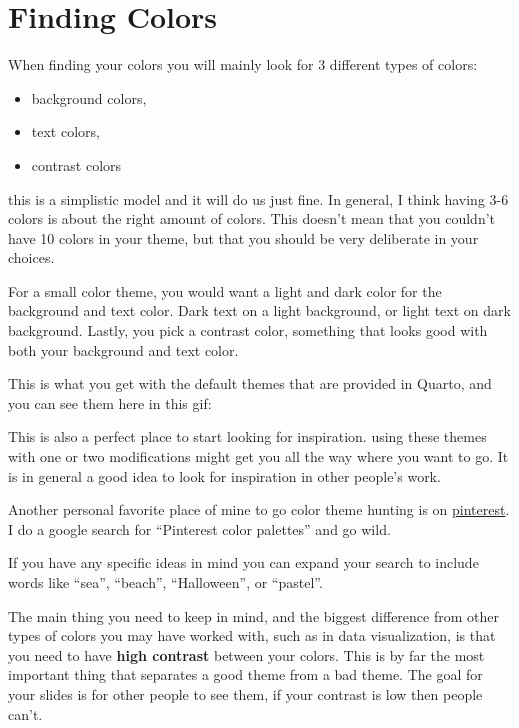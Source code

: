 \documentclass[
  letterpaper,
  DIV=11,
  numbers=noendperiod]{scrreprt}
\providecommand{\tightlist}{%
  \setlength{\itemsep}{0pt}\setlength{\parskip}{0pt}}\usepackage{longtable,booktabs,array}
\begin{document}
\section{Finding Colors}\label{finding-colors}

When finding your colors you will mainly look for 3 different types of
colors:

\begin{itemize}
\tightlist
\item
  background colors,
\item
  text colors,
\item
  contrast colors
\end{itemize}

this is a simplistic model and it will do us just fine. In general, I
think having 3-6 colors is about the right amount of colors. This
doesn't mean that you couldn't have 10 colors in your theme, but that
you should be very deliberate in your choices.

For a small color theme, you would want a light and dark color for the
background and text color. Dark text on a light background, or light
text on dark background. Lastly, you pick a contrast color, something
that looks good with both your background and text color.

This is what you get with the default themes that are provided in
Quarto, and you can see them here in this gif:

This is also a perfect place to start looking for inspiration. using
these themes with one or two modifications might get you all the way
where you want to go. It is in general a good idea to look for
inspiration in other people's work.

Another personal favorite place of mine to go color theme hunting is on
\href{https://www.pinterest.com/}{pinterest}. I do a google search for
``Pinterest color palettes'' and go wild.

If you have any specific ideas in mind you can expand your search to
include words like ``sea'', ``beach'', ``Halloween'', or ``pastel''.

The main thing you need to keep in mind, and the biggest difference from
other types of colors you may have worked with, such as in data
visualization, is that you need to have \textbf{high contrast} between
your colors. This is by far the most important thing that separates a
good theme from a bad theme. The goal for your slides is for other
people to see them, if your contrast is low then people can't.
\end{document}

